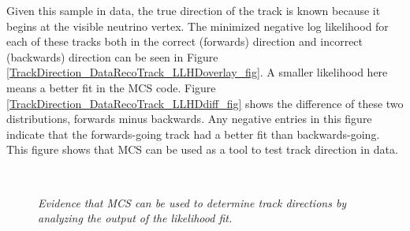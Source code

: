 Given this sample in {\ub} data, the true direction of the track is known because it begins at the visible neutrino vertex. The minimized negative log likelihood for each of these tracks both in the correct (forwards) direction and incorrect (backwards) direction can be seen in Figure \ref{TrackDirection_DataRecoTrack_LLHDoverlay_fig}. A smaller likelihood here means a better fit in the MCS code. Figure \ref{TrackDirection_DataRecoTrack_LLHDdiff_fig} shows the difference of these two distributions, forwards minus backwards. Any negative entries in this figure indicate that the forwards-going track had a better fit than backwards-going. This figure shows that MCS can be used as a tool to test track direction in {\ub} data.

\begin{figure}
\centering
\mbox{
	\quad
	}
\caption{\textit{Evidence that MCS can be used to determine track directions by analyzing the output of the likelihood fit.}}
\end{figure}